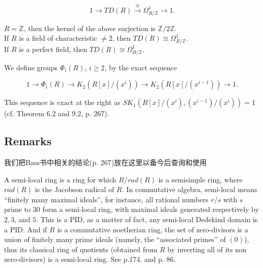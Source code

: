 \[1\longrightarrow TD(R)\overset{\cong}\longrightarrow \Omega^1_{R/\mathbb{Z}}\longrightarrow 1.\]  
\begin{example}
	$R=\mathbb{Z}$, then the kernel of the above surjection is $\mathbb{Z}/2\mathbb{Z}$.\\
	If $R$ is a field of characteristic $\neq 2$, then $TD(R)\cong \Omega^1_{R/\mathbb{Z}}$.\\
	If $R$ is a perfect field, then $TD(R)\cong \Omega^1_{R/\mathbb{Z}}$.
\end{example}
\begin{definition}
	We define groups  $\Phi_i(R)$, $i\geq 2$, by the exact sequence

	\begin{equation}
	\label{exact:phi}
	1 \longrightarrow \Phi_i(R) \longrightarrow K_2 (R[x]/(x^i))  \longrightarrow K_2(R[x]/(x^{i-1})) \longrightarrow 1.
	\end{equation}

\end{definition}
This sequence is exact at the right as  $SK_1(R[x]/(x^i), (x^{i-1})/(x^i))=  1$ (cf. \cite{MR50:2304} Theorem 6.2 and \cite{MR40:2736}9.2, p. 267).
\subsection{Remarks} %
\label{subsec:remarks}我们把Bass书\cite{MR40:2736}中相关的结论(p. 267)放在这里以备今后查询和使用

A semi-local ring is a ring for which $R/rad(R)$ is a semisimple ring, where $rad(R)$ is the Jacobson radical of $R$. In commutative algebra, semi-local means ``finitely many maximal ideals'', for instance, all rational numbers $r/s$ with $s$ prime to $30$ form a semi-local ring, with maximal ideals generated respectively by $2,3$, and $5$. This is a PID, as a matter of fact, any semi-local Dedekind domain is a PID. And if $R$ is a commutative noetherian ring, the set of zero-divisors is a union of finitely many prime ideals (namely, the ``associated primes'' of $(0)$), thus its classical ring of quotients (obtained from $R$ by inverting all of its non zero-divisors) is a semi-local ring. See \cite{book:975816} p.174. and \cite{MR40:2736} p. 86.



